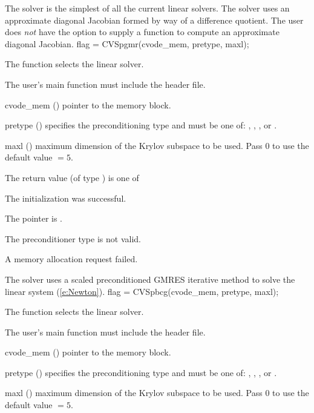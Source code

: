 {
  The {\cvdiag} solver is the simplest of all the current {\cvode} linear solvers. 
  The {\cvdiag} solver uses an approximate diagonal Jacobian formed by way of a
  difference quotient. The user does {\em not} have the option to supply a
  function to compute an approximate diagonal Jacobian.
}
{
  flag = CVSpgmr(cvode\_mem, pretype, maxl);
}
{
  The function  selects the {\cvspgmr} linear solver. 

  The user's main function must include the  header file.
}
{
  \begin{args}
  \item[cvode\_mem] ()
    pointer to the {\cvode} memory block.
  \item[pretype] ()
    specifies the preconditioning type and must be one of: 
    , , , or .
  \item[maxl] ()
    maximum dimension of the Krylov subspace to be used. Pass $0$ to use the 
    default value  $= 5$.
  \end{args}
}
{
  The return value  (of type ) is one of
  \begin{args}
  \item[\Id{CVSPILS\_SUCCESS}] 
    The {\cvspgmr} initialization was successful.
  \item[\Id{CVSPILS\_MEM\_NULL}]
    The  pointer is .
  \item[\Id{CVSPILS\_ILL\_INPUT}]
    The preconditioner type  is not valid.
  \item[\Id{CVSPILS\_MEM\_FAIL}]
    A memory allocation request failed.
  \end{args}
}
{
  The {\cvspgmr} solver uses a scaled preconditioned GMRES
  iterative method to solve the linear system (\ref{e:Newton}).
}
{
  flag = CVSpbcg(cvode\_mem, pretype, maxl);
}
{
  The function  selects the {\cvspbcg} linear solver. 

  The user's main function must include the  header file.
}
{
  \begin{args}
  \item[cvode\_mem] ()
    pointer to the {\cvode} memory block.
  \item[pretype] ()
    specifies the preconditioning type and must be one of: 
    , , , or .
  \item[maxl] ()
    maximum dimension of the Krylov subspace to be used. Pass $0$ to use the 
    default value  $= 5$.
  \end{args}
}

